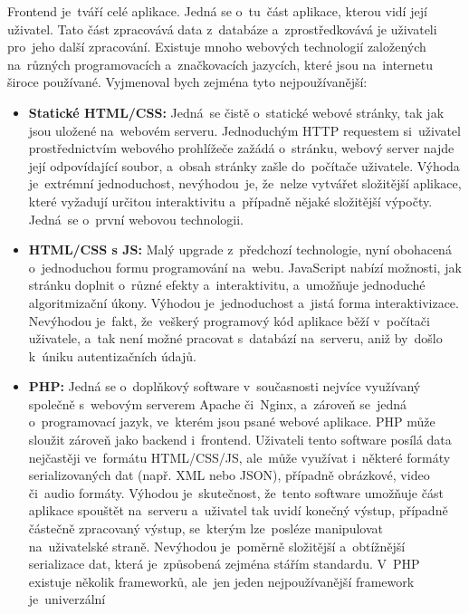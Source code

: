 Frontend je~tváří celé aplikace. Jedná se o~tu~část aplikace, kterou vidí
její uživatel. Tato část zpracovává data z~databáze a~zprostředkovává je
uživateli pro~jeho další zpracování. Existuje mnoho webových technologií
založených na~různých programovacích a~značkovacích jazycích, které jsou
na~internetu široce používané. Vyjmenoval bych zejména tyto nejpoužívanější:

\begin{itemize}
    \item \textbf{Statické HTML/CSS:} Jedná~se čistě o~statické webové
        stránky, tak jak jsou uložené na~webovém serveru. Jednoduchým
        HTTP requestem si~uživatel prostřednictvím webového prohlížeče
        zažádá o~stránku, webový server najde její odpovídající soubor,
        a~obsah stránky zašle do~počítače uživatele. Výhoda je~extrémní
        jednoduchost, nevýhodou~je, že~nelze vytvářet složitější aplikace,
        které vyžadují určitou interaktivitu a~případně nějaké složitější
        výpočty. Jedná~se o~první webovou technologii.
    \item \textbf{HTML/CSS s JS:} Malý upgrade z~předchozí technologie,
        nyní obohacená o~jednoduchou formu programování na~webu. JavaScript
        nabízí možnosti, jak stránku doplnit o~různé efekty a~interaktivitu,
        a~umožňuje jednoduché algoritmizační úkony. Výhodou je~jednoduchost
        a~jistá forma interaktivizace. Nevýhodou je~fakt, že~veškerý
        programový kód aplikace běží v~počítači uživatele, a~tak není možné
        pracovat s~databází na~serveru, aniž by~došlo k~úniku autentizačních
        údajů.
    \item \textbf{PHP:} Jedná se o~doplňkový software v~současnosti nejvíce
        využívaný společně s~webovým serverem Apache či~Nginx, a~zároveň
        se~jedná o~programovací jazyk, ve~kterém jsou psané webové aplikace.
        PHP může sloužit zároveň jako backend i~frontend. Uživateli tento
        software posílá data nejčastěji ve~formátu HTML/CSS/JS, ale~může
        využívat i~některé formáty serializovaných dat (např. XML nebo JSON),
        případně obrázkové, video či~audio formáty. Výhodou je~skutečnost,
        že~tento software umožňuje část aplikace spouštět na~serveru
        a~uživatel tak uvidí konečný výstup, případně částečně zpracovaný
        výstup, se~kterým lze~posléze manipulovat na~uživatelské straně.
        Nevýhodou je~poměrně složitější a~obtížnější serializace dat, která
        je~způsobená zejména stářím standardu. V~PHP existuje několik
        frameworků, ale~jen jeden nejpoužívanější framework je~univerzální

\end{itemize}
